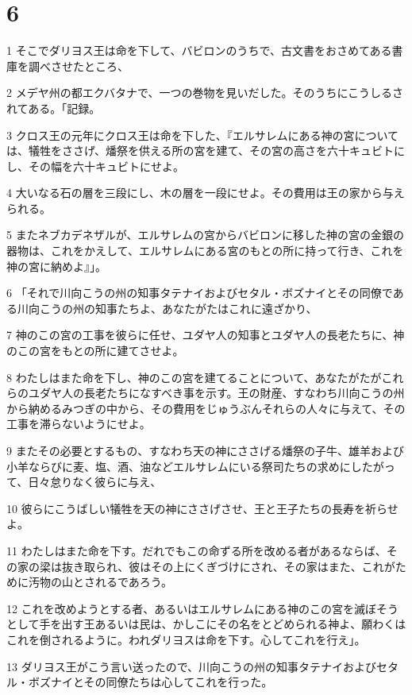 \chapter{6}

\par 1 そこでダリヨス王は命を下して、バビロンのうちで、古文書をおさめてある書庫を調べさせたところ、
\par 2 メデヤ州の都エクバタナで、一つの巻物を見いだした。そのうちにこうしるされてある。「記録。
\par 3 クロス王の元年にクロス王は命を下した、『エルサレムにある神の宮については、犠牲をささげ、燔祭を供える所の宮を建て、その宮の高さを六十キュビトにし、その幅を六十キュビトにせよ。
\par 4 大いなる石の層を三段にし、木の層を一段にせよ。その費用は王の家から与えられる。
\par 5 またネブカデネザルが、エルサレムの宮からバビロンに移した神の宮の金銀の器物は、これをかえして、エルサレムにある宮のもとの所に持って行き、これを神の宮に納めよ』」。
\par 6 「それで川向こうの州の知事タテナイおよびセタル・ボズナイとその同僚である川向こうの州の知事たちよ、あなたがたはこれに遠ざかり、
\par 7 神のこの宮の工事を彼らに任せ、ユダヤ人の知事とユダヤ人の長老たちに、神のこの宮をもとの所に建てさせよ。
\par 8 わたしはまた命を下し、神のこの宮を建てることについて、あなたがたがこれらのユダヤ人の長老たちになすべき事を示す。王の財産、すなわち川向こうの州から納めるみつぎの中から、その費用をじゅうぶんそれらの人々に与えて、その工事を滞らないようにせよ。
\par 9 またその必要とするもの、すなわち天の神にささげる燔祭の子牛、雄羊および小羊ならびに麦、塩、酒、油などエルサレムにいる祭司たちの求めにしたがって、日々怠りなく彼らに与え、
\par 10 彼らにこうばしい犠牲を天の神にささげさせ、王と王子たちの長寿を祈らせよ。
\par 11 わたしはまた命を下す。だれでもこの命ずる所を改める者があるならば、その家の梁は抜き取られ、彼はその上にくぎづけにされ、その家はまた、これがために汚物の山とされるであろう。
\par 12 これを改めようとする者、あるいはエルサレムにある神のこの宮を滅ぼそうとして手を出す王あるいは民は、かしこにその名をとどめられる神よ、願わくはこれを倒されるように。われダリヨスは命を下す。心してこれを行え」。
\par 13 ダリヨス王がこう言い送ったので、川向こうの州の知事タテナイおよびセタル・ボズナイとその同僚たちは心してこれを行った。
